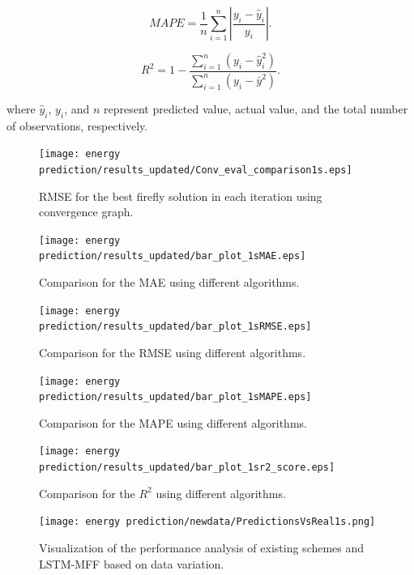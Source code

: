 \documentclass[journal]{IEEEtran}
\begin{document}
\begin{equation}
MAPE = \frac{1}{n} \sum_{i=1}^{n} \left| \frac{y_i - \hat{y}_i}{y_i} \right|.
\label{MAPE1}
\end{equation}


\begin{equation}
    R^2 = 1-\frac{\sum_{i=1}^{n} (y_i -\hat{y}_i^2)}{\sum_{i=1}^{n} (y_i- \bar{y}^2)}.
    \label{R_Score}
\end{equation}

where \(\hat{y}_i \), \( y_i \), and \( n \) represent predicted value, actual value, and the total number of observations, respectively. 



 \begin{figure}[!h]
		\centering
        \texttt{[image: energy prediction/results\_updated/Conv\_eval\_comparison1s.eps]}
		\caption{\centering RMSE for the best firefly solution in each iteration using convergence graph.}
		\label{ff and mff}
	\end{figure}



 \begin{figure}[!h]
		\centering
		\texttt{[image: energy prediction/results\_updated/bar\_plot\_1sMAE.eps]}
		\caption{\centering Comparison for the MAE using different algorithms.}
		\label{MAE}
	\end{figure}
\begin{figure}[!h]
		\centering
		\texttt{[image: energy prediction/results\_updated/bar\_plot\_1sRMSE.eps]}
		\caption{Comparison for the RMSE using different algorithms.}
		\label{RMSE}
	\end{figure}

 	

  	\begin{figure}[!h]
		\centering
		\texttt{[image: energy prediction/results\_updated/bar\_plot\_1sMAPE.eps]}
		\caption{Comparison for the MAPE using different algorithms.}
		\label{MAPE}
	\end{figure}

\begin{figure}[!h]
		\centering
		\texttt{[image: energy prediction/results\_updated/bar\_plot\_1sr2\_score.eps]}
		\caption{Comparison for the $R^2$ using different algorithms.}
		\label{R2}
	\end{figure}

 \begin{figure}[!h]
	\centering
	\texttt{[image: energy prediction/newdata/PredictionsVsReal1s.png]}
	\caption{\centering Visualization of the performance analysis of existing schemes and LSTM-MFF based on data variation.}
	\label{prediction vs real}
\end{figure}
\end{document}
